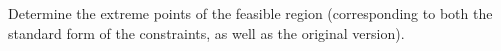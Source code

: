 Determine the extreme points of the feasible region (corresponding to both the standard form of the constraints, as well
as the original version).

\begin{solution}
  \ \\
\end{solution}